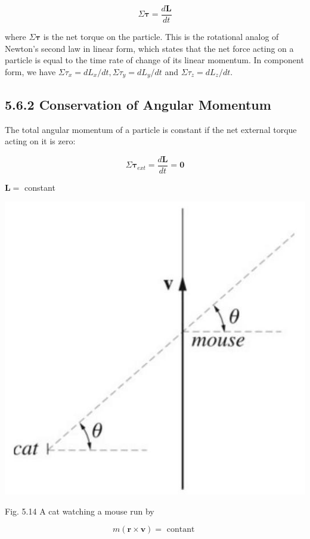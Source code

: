 \documentclass[10pt]{article}
\begin{document}
$$
\Sigma \boldsymbol{\tau}=\frac{d \mathbf{L}}{d t}
$$

where $\Sigma \boldsymbol{\tau}$ is the net torque on the particle. This is the rotational analog of Newton's second law in linear form, which states that the net force acting on a particle is equal to the time rate of change of its linear momentum. In component form, we have $\Sigma \tau_{x}=d L_{x} / d t, \Sigma \tau_{y}=d L_{y} / d t$ and $\Sigma \tau_{z}=d L_{z} / d t$.

\subsection*{5.6.2 Conservation of Angular Momentum}
The total angular momentum of a particle is constant if the net external torque acting on it is zero:

$$
\Sigma \boldsymbol{\tau}_{e x t}=\frac{d \mathbf{L}}{d t}=\mathbf{0}
$$

$\mathbf{L}=$ constant

\begin{center}
\includegraphics[max width=\textwidth]{2024_09_13_db1f357d2aad0a03eb2eg-092(1)}
\end{center}

Fig. 5.14 A cat watching a mouse run by

$$
m(\mathbf{r} \times \mathbf{v})=\text { contant }
$$
\end{document}
